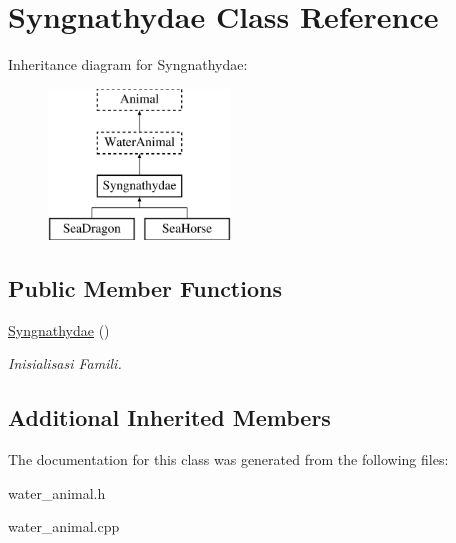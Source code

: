\hypertarget{class_syngnathydae}{}\section{Syngnathydae Class Reference}
\label{class_syngnathydae}
Inheritance diagram for Syngnathydae\+:\begin{figure}[H]
\begin{center}
\leavevmode
\includegraphics[height=4.000000cm]{class_syngnathydae}
\end{center}
\end{figure}
\subsection*{Public Member Functions}
\begin{DoxyCompactItemize}
\item 
\hyperlink{class_syngnathydae_a2fbbbd5e0f6a9576ef625b673eac7b80}{Syngnathydae} ()\hypertarget{class_syngnathydae_a2fbbbd5e0f6a9576ef625b673eac7b80}{}\label{class_syngnathydae_a2fbbbd5e0f6a9576ef625b673eac7b80}

\begin{DoxyCompactList}\small\item\em Inisialisasi Famili. \end{DoxyCompactList}\end{DoxyCompactItemize}
\subsection*{Additional Inherited Members}


The documentation for this class was generated from the following files\+:\begin{DoxyCompactItemize}
\item 
water\+\_\+animal.\+h\item 
water\+\_\+animal.\+cpp\end{DoxyCompactItemize}
